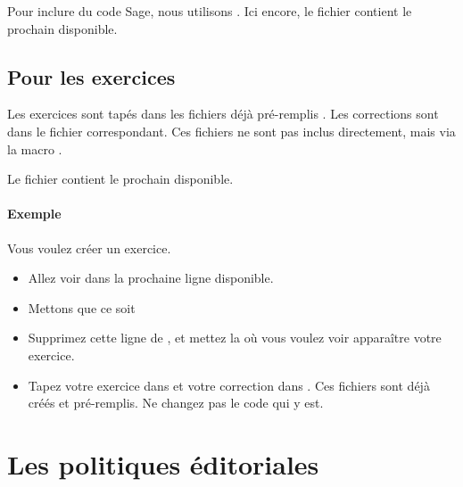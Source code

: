 Pour inclure du code Sage, nous utilisons . Ici encore, le fichier  contient le prochain disponible.

\subsection{Pour les exercices}

Les exercices sont tapés dans les fichiers déjà pré-remplis . Les corrections sont dans le fichier  correspondant. Ces fichiers ne sont pas inclus directement, mais via la macro .

Le fichier  contient le prochain disponible.

\paragraph{Exemple}

Vous voulez créer un exercice. 
\begin{itemize}
    \item Allez voir dans  la prochaine ligne  disponible.
    \item Mettons que ce soit   
    \item Supprimez cette ligne de , et mettez la où vous voulez voir apparaître votre exercice.
    \item Tapez votre exercice dans  et votre correction dans . Ces fichiers sont déjà créés et pré-remplis. Ne changez pas le code qui y est.
\end{itemize}

\section{Les politiques éditoriales}

